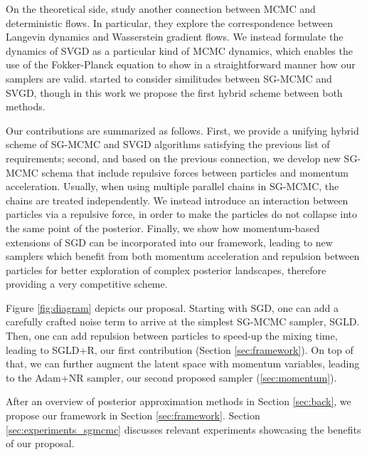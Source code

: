 On the theoretical side, \cite{chen2018unified} study another connection between MCMC and deterministic flows. In particular, they explore the correspondence between Langevin dynamics and Wasserstein gradient flows.
We instead formulate the dynamics of SVGD as a particular kind of MCMC dynamics, which enables the use of the Fokker-Planck equation to show in a straightforward manner how our samplers are valid. \cite{liu2017stein} started to consider similitudes between SG-MCMC and SVGD, though in this work we propose the first hybrid scheme between both methods.



Our contributions are summarized as follows. First, we provide a unifying hybrid scheme of SG-MCMC and SVGD algorithms satisfying the previous list of requirements; second, and based on the previous connection, 
we develop new SG-MCMC schema that include repulsive forces between particles and momentum acceleration. Usually, when using multiple parallel chains in SG-MCMC, the chains are treated independently. We instead introduce an interaction between particles via a repulsive force, in order to make the particles do not collapse into the same point of the posterior.
Finally, we show how momentum-based extensions of SGD can be incorporated into our framework, leading to new samplers which benefit from both momentum acceleration and repulsion between particles for better exploration of complex posterior landscapes, therefore providing a very competitive scheme. 

Figure \ref{fig:diagram} depicts our proposal. Starting with SGD, one can add a carefully crafted noise term to arrive at the simplest SG-MCMC sampler, SGLD. Then, one can add repulsion between particles to speed-up the mixing time, leading to SGLD+R, our first contribution (Section \ref{sec:framework}). On top of that, we can further augment the latent space with momentum variables, leading to the Adam+NR sampler, our second proposed sampler (\ref{sec:momentum}).

After an overview of posterior approximation methods in Section \ref{sec:back}, we propose our framework in Section \ref{sec:framework}.
Section \ref{sec:experiments_sgmcmc} discusses relevant experiments showcasing the benefits of our proposal. %


